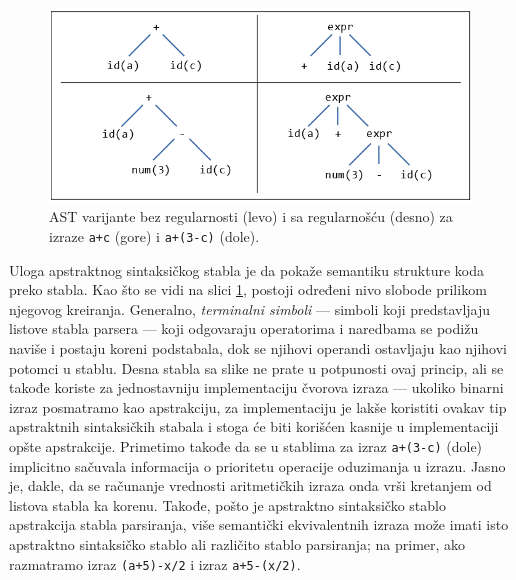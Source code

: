 \begin{figure}[h!]
\centering
\includegraphics[scale=0.7]{images/ast.png}
\caption{AST varijante bez regularnosti (levo) i sa regularnošću (desno) za izraze \texttt{a+c} (gore) i \texttt{a+(3-c)} (dole).} 
\label{fig:ASTVariants}
\end{figure}

Uloga apstraktnog sintaksičkog stabla \cite{FormalSyntaxAndSemantics} je da pokaže semantiku strukture koda preko stabla. Kao što se vidi na slici \ref{fig:ASTVariants}, postoji određeni nivo slobode prilikom njegovog kreiranja. Generalno, \emph{terminalni simboli} --- simboli koji predstavljaju listove stabla parsera --- koji odgovaraju operatorima i naredbama se podižu naviše i postaju koreni podstabala, dok se njihovi operandi ostavljaju kao njihovi potomci u stablu. Desna stabla sa slike ne prate u potpunosti ovaj princip, ali se takođe koriste za jednostavniju implementaciju čvorova izraza --- ukoliko binarni izraz posmatramo kao apstrakciju, za implementaciju je lakše koristiti ovakav tip apstraktnih sintaksičkih stabala i stoga će biti korišćen kasnije u implementaciji opšte apstrakcije. Primetimo takođe da se u stablima za izraz \texttt{a+(3-c)} (dole) implicitno sačuvala informacija o prioritetu operacije oduzimanja u izrazu. Jasno je, dakle, da se računanje vrednosti aritmetičkih izraza onda vrši kretanjem od listova stabla ka korenu. Takođe, pošto je apstraktno sintaksičko stablo apstrakcija stabla parsiranja, više semantički ekvivalentnih izraza može imati isto apstraktno sintaksičko stablo ali različito stablo parsiranja; na primer, ako razmatramo izraz \texttt{(a+5)-x/2} i izraz \texttt{a+5-(x/2)}.

